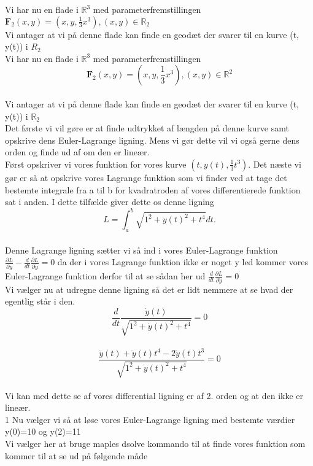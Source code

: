 
Vi har nu en flade i $\mathbb{R}^3$ med parameterfremstillingen \\
$\textbf{F}_{2}(x,y)=(x, y, \frac{1}{3}x^3), (x,y) \in \mathbb{R}_{2} $\\
Vi antager at vi på denne flade kan finde en geodæt  der svarer til en kurve (t, y(t)) i $R_{2}$ \\
Vi har nu en flade i $\mathbb{R}^3$ med parameterfremstillingen \\
$$\textbf{F}_{2}(x,y)=(x, y, \frac{1}{3}x^3), (x,y) \in \mathbb{R}^2 $$\\
Vi antager at vi på denne flade kan finde en geodæt  der svarer til en kurve (t, y(t)) i $\mathbb{R}_{2}$ \\
Det første vi vil gøre er at finde udtrykket af længden på denne kurve samt opskrive dens Euler-Lagrange ligning. Mens vi gør dette vil vi også gerne dens orden og finde ud af om den er lineær. \\
Først opskriver vi vores funktion for vores kurve $(t,y(t), \frac{1}{3} t^3)$. Det næste vi gør er så at opskrive vores Lagrange funktion som vi finder ved at tage det bestemte integrale fra a til b for kvadratroden af vores differentierede funktion sat i anden. I dette tilfælde giver dette os denne ligning \\
$$L=\int_{a}^{b} \sqrt{1^2+ \dot{y}(t)^2+t^4}dt. $$\\
Denne Lagrange ligning sætter vi så ind i vores Euler-Lagrange funktion $ \frac{ \partial L}{ \partial y}-  \frac{d}{dt} \frac{ \partial L}{ \partial \dot{y}}=0$ da der i vores Lagrange funktion ikke er noget y led kommer vores Euler-Lagrange funktion derfor til at se sådan her ud $ \frac{d}{dt} \frac{ \partial L}{ \partial \dot{y}}=0 $\\
Vi vælger nu at udregne denne ligning så det er lidt nemmere at se hvad der egentlig står i den. \\
$$ \frac{d}{dt} \frac{ \dot{y}(t)}{ \sqrt{1^2+ \dot{y}(t)^2+t^4}}=0  $$\\
$$ \frac{ \ddot{y}(t)+ \ddot{y}(t)t^4-2 \dot{y}(t)t^3}{\sqrt{1^2+ \dot{y}(t)^2+t^4}}=0 $$\\
Vi kan med dette se af vores differential ligning er af 2. orden og at den ikke er lineær. \\1
Nu vælger vi så at løse vores Euler-Lagrange ligning med bestemte værdier y(0)=10 og y(2)=11 \\
Vi vælger her at bruge maples dsolve kommando til at finde vores funktion som kommer til at se ud på følgende måde \\
